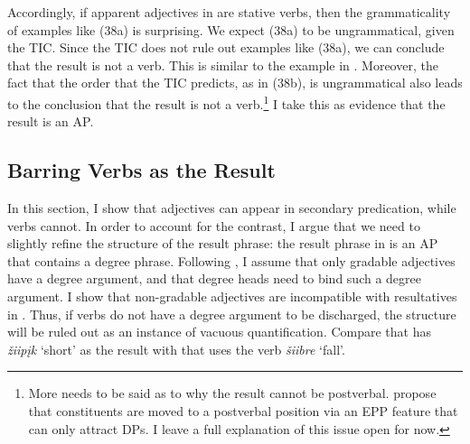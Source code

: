 \documentclass[output=paper]{LSP/langsci}
\begin{document}
Accordingly, if apparent adjectives in  are stative verbs, then the grammaticality of examples like (38a) is surprising. We expect (38a) to be ungrammatical, given the TIC. Since the TIC does not rule out examples like (38a), we can conclude that the result is not a verb. This is similar to the  example in . Moreover, the fact that the order that the TIC predicts, as in (38b), is ungrammatical also leads to the conclusion that the result is not a verb.\footnote{More needs to be said as to why the result cannot be postverbal. \citet{JohnsonRosen2014} propose that constituents are moved to a postverbal position via an EPP feature that can only attract DPs. I leave a full explanation of this issue open for now.} I take this as evidence that the result is an AP.

\subsection{Barring Verbs as the Result}

In this section, I show that adjectives can appear in  secondary predication, while verbs cannot. In order to account for the contrast, I argue that we need to slightly refine the structure of the result phrase: the result phrase in  is an AP that contains a degree phrase. Following \citet{Corver1997},  I assume that only gradable adjectives have a degree argument, and that degree heads need to bind such a degree argument. I show that non-gradable adjectives are incompatible with resultatives in . Thus, if verbs do not have a degree argument to be discharged, the structure will be ruled out as an instance of vacuous quantification. Compare  that has \textit{žiipįk} `short' as the result with  that uses the verb \textit{šiibre} `fall'.

\begin{exe}



\end{exe}
\end{document}
